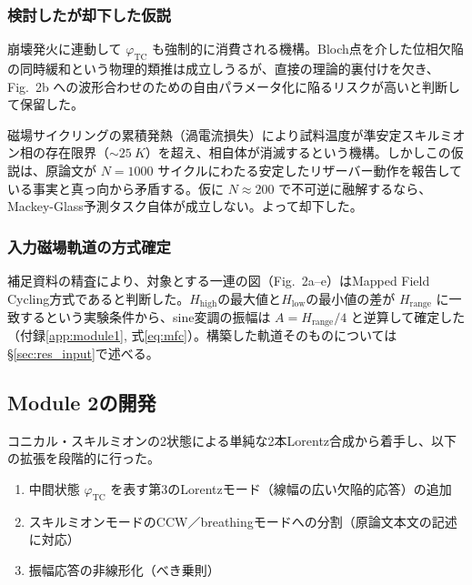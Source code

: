 \documentclass[11pt,a4paper]{ltjsarticle}
\begin{document}
\subsubsection{検討したが却下した仮説}

\begin{description}[leftmargin=12mm,style=nextline]
\item[TC--アバランシェ結合の導入]
崩壊発火に連動して $\varphi_\mathrm{TC}$ も強制的に消費される機構。Bloch点を介した位相欠陥の同時緩和という物理的類推は成立しうるが、直接の理論的裏付けを欠き、Fig.~2b への波形合わせのための自由パラメータ化に陥るリスクが高いと判断して保留した。

\item[温度駆動の窓閉鎖仮説]
磁場サイクリングの累積発熱（渦電流損失）により試料温度が準安定スキルミオン相の存在限界（$\sim\SI{25}{K}$）を超え、相自体が消滅するという機構。しかしこの仮説は、原論文が $N=1000$ サイクルにわたる安定したリザーバー動作を報告している事実と真っ向から矛盾する。仮に $N\approx200$ で不可逆に融解するなら、Mackey-Glass予測タスク自体が成立しない。よって却下した。
\end{description}

\subsubsection{入力磁場軌道の方式確定}

補足資料の精査により、対象とする一連の図（Fig.~2a--e）はMapped Field Cycling方式であると判断した。$H_\mathrm{high}$の最大値と$H_\mathrm{low}$の最小値の差が $H_\mathrm{range}$ に一致するという実験条件から、sine変調の振幅は $A = H_\mathrm{range}/4$ と逆算して確定した（付録\ref{app:module1}, 式\eqref{eq:mfc}）。構築した軌道そのものについては\S\ref{sec:res_input}で述べる。

\subsection{Module 2の開発}

コニカル・スキルミオンの2状態による単純な2本Lorentz合成から着手し、以下の拡張を段階的に行った。

\begin{enumerate}[leftmargin=8mm]
\item 中間状態 $\varphi_\mathrm{TC}$ を表す第3のLorentzモード（線幅の広い欠陥的応答）の追加
\item スキルミオンモードのCCW／breathingモードへの分割（原論文本文の記述に対応）
\item 振幅応答の非線形化（べき乗則）
\end{enumerate}
\end{document}
